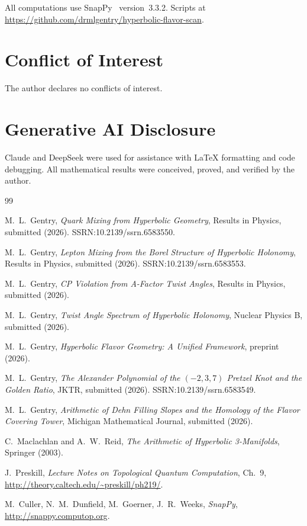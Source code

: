 \documentclass[12pt]{article}
\theoremstyle{definition}
\begin{document}
All computations use SnapPy~\cite{snappy} version~3.3.2.
Scripts at \url{https://github.com/drmlgentry/hyperbolic-flavor-scan}.

\section*{Conflict of Interest}

The author declares no conflicts of interest.

\section*{Generative AI Disclosure}

Claude and DeepSeek were used for assistance with \LaTeX{} formatting
and code debugging. All mathematical results were conceived, proved,
and verified by the author.

\begin{thebibliography}{99}

M.~L.~Gentry,
\textit{Quark Mixing from Hyperbolic Geometry},
Results in Physics, submitted (2026). SSRN:10.2139/ssrn.6583550.

M.~L.~Gentry,
\textit{Lepton Mixing from the Borel Structure of Hyperbolic Holonomy},
Results in Physics, submitted (2026). SSRN:10.2139/ssrn.6583553.

M.~L.~Gentry,
\textit{CP Violation from A-Factor Twist Angles},
Results in Physics, submitted (2026).

M.~L.~Gentry,
\textit{Twist Angle Spectrum of Hyperbolic Holonomy},
Nuclear Physics B, submitted (2026).

M.~L.~Gentry,
\textit{Hyperbolic Flavor Geometry: A Unified Framework},
preprint (2026).

M.~L.~Gentry,
\textit{The Alexander Polynomial of the $(-2,3,7)$ Pretzel Knot
and the Golden Ratio},
JKTR, submitted (2026). SSRN:10.2139/ssrn.6583549.

M.~L.~Gentry,
\textit{Arithmetic of Dehn Filling Slopes and the Homology of
the Flavor Covering Tower},
Michigan Mathematical Journal, submitted (2026).

C.~Maclachlan and A.~W.~Reid,
\textit{The Arithmetic of Hyperbolic 3-Manifolds},
Springer (2003).

J.~Preskill,
\textit{Lecture Notes on Topological Quantum Computation},
Ch.~9, \url{http://theory.caltech.edu/~preskill/ph219/}.

M.~Culler, N.~M.~Dunfield, M.~Goerner, J.~R.~Weeks,
\textit{SnapPy}, \url{http://snappy.computop.org}.

\end{thebibliography}
\end{document}
